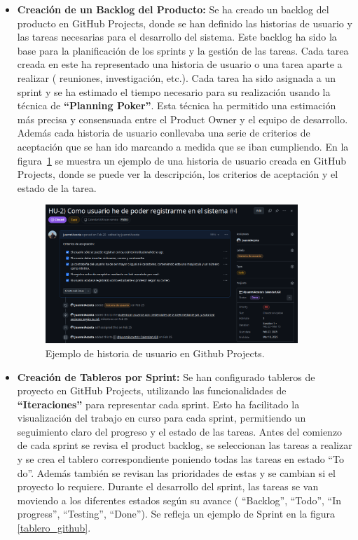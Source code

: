\begin{itemize}
    \item \textbf{Creación de un Backlog del Producto:} Se ha creado un backlog del producto en GitHub Projects, donde se han definido las historias de usuario y las tareas necesarias para el desarrollo del sistema. Este backlog ha sido la base para la planificación de los sprints y la gestión de las tareas.
    \newline\newline
    Cada tarea creada en este ha representado una historia de usuario o una tarea aparte a realizar ( reuniones, investigación, etc.). Cada tarea ha sido asignada a un sprint y se ha estimado el tiempo necesario para su realización usando la técnica de \textbf{``Planning Poker''}. Esta técnica ha permitido una estimación más precisa y consensuada entre el Product Owner y el equipo de desarrollo.
    Además cada historia de usuario conllevaba una serie de criterios de aceptación que se han ido marcando a medida que se iban cumpliendo. En la figura~\ref{historia de usuario} se muestra un ejemplo de una historia de usuario creada en GitHub Projects, donde se puede ver la descripción, los criterios de aceptación y el estado de la tarea.
    
    \begin{figure}[H] 
        \centering 
        \includegraphics[width=0.9\textwidth]{figures/05_hu.png}
        \caption{Ejemplo de historia de usuario en Github Projects.} %
        \label{historia de usuario} %
    \end{figure}

    \item \textbf{Creación de Tableros por Sprint:} Se han configurado tableros de proyecto en GitHub Projects, utilizando las funcionalidades de \textbf{``Iteraciones''} para representar cada sprint. Esto ha facilitado la visualización del trabajo en curso para cada sprint, permitiendo un seguimiento claro del progreso y el estado de las tareas.
    \newline
    Antes del comienzo de cada sprint se revisa el product backlog, se seleccionan las tareas a realizar y se crea el tablero correspondiente poniendo todas las tareas en estado ``To do''. Además también se revisan las prioridades de estas y se cambian si el proyecto lo requiere.
    Durante el desarrollo del sprint, las tareas se van moviendo a los diferentes estados según su avance ( ``Backlog'', ``Todo'', ``In progress'', ``Testing'', ``Done''). Se refleja un ejemplo de Sprint en la figura \ref{tablero_github}.
    

\end{itemize}
